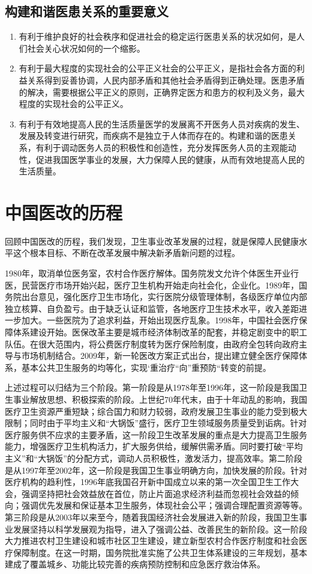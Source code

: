 \documentclass[11pt,twoside,a4paper]{article}
\begin{document}
		\subsection{构建和谐医患关系的重要意义}
		\begin{enumerate}
			\item 有利于维护良好的社会秩序和促进社会的稳定运行医患关系的状况如何，是人们社会关心状况如何的一个缩影。
			\item 有利于最大程度的实现社会的公平正义社会的公平正义，是指社会各方面的利益关系得到妥善协调，人民内部矛盾和其他社会矛盾得到正确处理。医患矛盾的解决，需要根据公平正义的原则，正确界定医方和患方的权利及义务，最大程度的实现社会的公平正义。
			\item 有利于有效地提高人民的生活质量医学的发展离不开医务人员对疾病的发生、发展及转变进行研究，而疾病不是独立于人体而存在的。构建和谐的医患关系，有利于调动医务人员的积极性和创造性，充分发挥医务人员的主观能动性，促进我国医学事业的发展，大力保障人民的健康，从而有效地提高人民的生活质量。
		\end{enumerate}
		
		\section{中国医改的历程}
		回顾中国医改的历程，我们发现，卫生事业改革发展的过程，就是保障人民健康水平这个根本目标、不断在改革发展中解决新矛盾新问题的过程。
	
		1980年，取消单位医务室，农村合作医疗解体。国务院发文允许个体医生开业行医，民营医疗市场开始兴起，医疗卫生机构开始走向社会化，企业化。1989年，国务院出台意见，强化医疗卫生市场化，实行医院分级管理体制，各级医疗单位内部独立核算、自负盈亏。由于缺乏认证和监管，各地医疗卫生技术水平，收入差距进一步加大。一些医院为了追求利益，开始出现医疗乱象。1998年，中国社会医疗保障体系建设开始。医保改革主要是城市经济体制改革的配套，并稳定剧变中的职工队伍。在很大范围内，将公费医疗制度转为医疗保险制度，由政府全包转向政府主导与市场机制结合。2009年，新一轮医改方案正式出台，提出建立健全医疗保障体系，基本公共卫生服务的均等化，实现‘重治疗“向”重预防“转变的前提。
		
		上述过程可以归结为三个阶段。第一阶段是从1978年至1996年，这一阶段是我国卫生事业解放思想、积极探索的阶段。上世纪70年代末，由于十年动乱的影响，我国医疗卫生资源严重短缺；综合国力和财力较弱，政府发展卫生事业的能力受到极大限制；同时由于平均主义和“大锅饭”盛行，医疗卫生领域服务质量受到诟病。针对医疗服务供不应求的主要矛盾，这一阶段卫生改革发展的重点是大力提高卫生服务能力，增强医疗卫生机构活力，扩大服务供给，缓解供需矛盾。同时要打破“平均主义”和“大锅饭”的分配方式，调动人员积极性，激发活力，提高效率。第二阶段是从1997年至2002年，这一阶段是我国卫生事业明确方向，加快发展的阶段。针对医疗机构的趋利性，1996年底我国召开新中国成立以来的第一次全国卫生工作大会，强调坚持把社会效益放在首位，防止片面追求经济利益而忽视社会效益的倾向；强调优先发展和保证基本卫生服务，体现社会公平；强调合理配置资源等等。第三阶段是从2003年以来至今，随着我国经济社会发展进入新的阶段，我国卫生事业发展坚持以科学发展观为指导，进入了强调公益、改善民生的新阶段。这一阶段大力推进农村卫生建设和城市社区卫生建设，建立新型农村合作医疗制度和社会医疗保障制度。在这一时期，国务院批准实施了公共卫生体系建设的三年规划，基本建成了覆盖城乡、功能比较完善的疾病预防控制和应急医疗救治体系。
		
\end{document}
